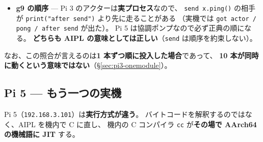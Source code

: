 \documentclass[11pt,a4paper]{ltjsarticle}
\begin{document}
\begin{itemize}
\item \textbf{g9 の順序} --- Pi 3 のアクターは\textbf{実プロセス}なので、
  \texttt{send x.ping()} の相手が \texttt{print("after send")} より先に走ることがある
  （実機では \texttt{got actor / pong / after send} が出た）。
  Pi 5 は協調ポンプなので必ず正典の順になる。
  \textbf{どちらも AIPL の意味としては正しい}（\texttt{send} は順序を約束しない）。
\end{itemize}

なお、この照合が言えるのは\textbf{1 本ずつ順に投入した場合}であって、
\textbf{10 本が同時に動くという意味ではない}（\S\ref{sec:pi3-onemodule}）。

\subsection{Pi 5 --- もう一つの実機}
\label{sec:xinu-pi5}

Pi 5（\texttt{192.168.3.101}）は\textbf{実行方式が違う}。
バイトコードを解釈するのではなく、AIPL を機内で C に直し、
機内の C コンパイラ \texttt{cc} が\textbf{その場で AArch64 の機械語に JIT} する。
\end{document}
